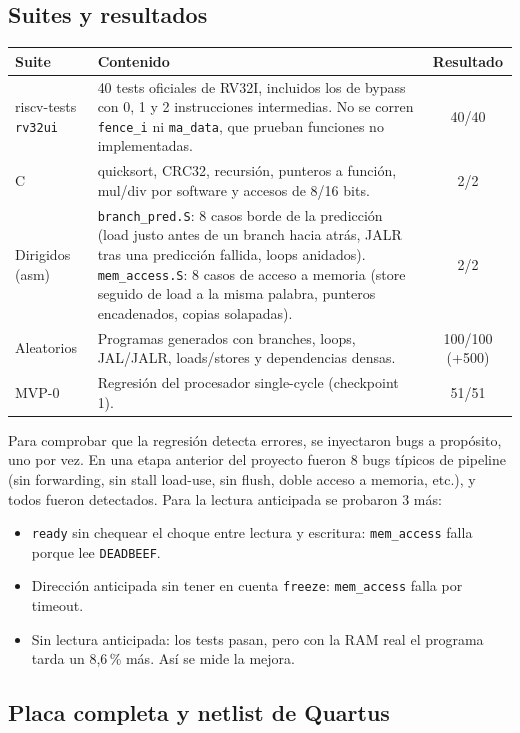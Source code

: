 \documentclass[11pt,a4paper]{article}
\newcommand{\code}[1]{\texttt{#1}}
\begin{document}
\subsection{Suites y resultados}

\begin{center}
\begin{tabularx}{\linewidth}{lLc}
\toprule
Suite & Contenido & Resultado \\
\midrule
riscv-tests \code{rv32ui} & 40 tests oficiales de RV32I, incluidos los de bypass con 0, 1 y 2 instrucciones intermedias. No se corren \code{fence\_i} ni \code{ma\_data}, que prueban funciones no implementadas. & 40/40 \\
C & quicksort, CRC32, recursión, punteros a función, mul/div por software y accesos de 8/16 bits. & 2/2 \\
Dirigidos (asm) & \code{branch\_pred.S}: 8 casos borde de la predicción (load justo antes de un branch hacia atrás, JALR tras una predicción fallida, loops anidados). \code{mem\_access.S}: 8 casos de acceso a memoria (store seguido de load a la misma palabra, punteros encadenados, copias solapadas). & 2/2 \\
Aleatorios & Programas generados con branches, loops, JAL/JALR, loads/stores y dependencias densas. & 100/100 (+500) \\
MVP-0 & Regresión del procesador single-cycle (checkpoint 1). & 51/51 \\
\bottomrule
\end{tabularx}
\end{center}

Para comprobar que la regresión detecta errores, se inyectaron bugs a propósito, uno por vez. En una etapa anterior del proyecto fueron 8 bugs típicos de pipeline (sin forwarding, sin stall load-use, sin flush, doble acceso a memoria, etc.), y todos fueron detectados. Para la lectura anticipada se probaron 3 más:
\begin{itemize}
\item \code{ready} sin chequear el choque entre lectura y escritura: \code{mem\_access} falla porque lee \code{DEADBEEF}.
\item Dirección anticipada sin tener en cuenta \code{freeze}: \code{mem\_access} falla por timeout.
\item Sin lectura anticipada: los tests pasan, pero con la RAM real el programa tarda un 8,6\,\% más. Así se mide la mejora.
\end{itemize}

\subsection{Placa completa y netlist de Quartus}
\end{document}
